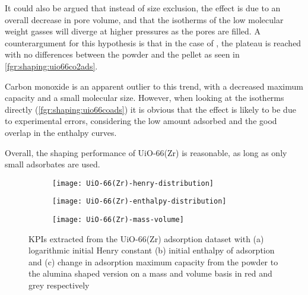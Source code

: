 It could also be argued that instead of size exclusion, the effect is due to
an overall decrease in pore volume, and that the isotherms of the
low molecular weight gasses will diverge at higher pressures
as the pores are filled. A counterargument for this hypothesis is that
in the case of , the plateau is reached with no differences
between the powder and the pellet as seen
in \autoref{fgr:shaping:uio66co2ads}.

Carbon monoxide is an apparent outlier to this trend, with a
decreased maximum capacity and a small molecular size.
However, when looking at the isotherms directly
(\autoref{fgr:shaping:uio66coads}) it is obvious that the effect is
likely to be due to experimental errors, considering
the low amount adsorbed and the good overlap in the enthalpy
curves.

Overall, the shaping performance of UiO-66(Zr) is
reasonable, as long as only small adsorbates are used.

\begin{figure}[p!]
	\centering
	\begin{subfigure}{\linewidth}
		\parbox[c]{0.1\linewidth}{\caption{}%
			\label{fgr:shaping:analysisuio66henry}}%
		\parbox[b]{0.8\linewidth}{%
			\texttt{[image: UiO-66(Zr)-henry-distribution]}%
		}%
	\end{subfigure}

	\begin{subfigure}{\linewidth}
		\parbox[c]{0.1\linewidth}{\caption{}%
			\label{fgr:shaping:analysisuio66enth}}%
		\parbox[b]{0.8\linewidth}{%
			\texttt{[image: UiO-66(Zr)-enthalpy-distribution]}%
		}%
	\end{subfigure}

	\begin{subfigure}{\linewidth}
		\parbox[c]{0.1\linewidth}{\caption{}%
			\label{fgr:shaping:analysisuio66basis}}%
		\parbox[b]{0.8\linewidth}{%
			\texttt{[image: UiO-66(Zr)-mass-volume]}%
		}%
	\end{subfigure}

	\caption{KPIs extracted from the UiO-66(Zr) adsorption dataset with
		(a) logarithmic initial Henry constant (b) initial enthalpy of
        adsorption and (c) change in adsorption maximum capacity from 
        the powder to the alumina shaped version on a mass and volume 
        basis in red and grey respectively}%
	\label{fgr:shaping:analysisuio66}
\end{figure}